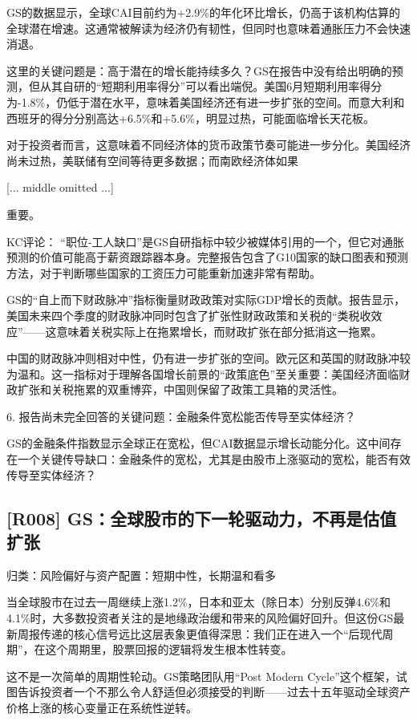 \documentclass[11pt]{ctexart}
\begin{document}
GS的数据显示，全球CAI目前约为+2.9\%的年化环比增长，仍高于该机构估算的全球潜在增速。这通常被解读为经济仍有韧性，但同时也意味着通胀压力不会快速消退。

这里的关键问题是：高于潜在的增长能持续多久？GS在报告中没有给出明确的预测，但从其自研的“短期利用率得分”可以看出端倪。美国6月短期利用率得分为-1.8\%，仍低于潜在水平，意味着美国经济还有进一步扩张的空间。而意大利和西班牙的得分分别高达+6.5\%和+5.6\%，明显过热，可能面临增长天花板。

对于投资者而言，这意味着不同经济体的货币政策节奏可能进一步分化。美国经济尚未过热，美联储有空间等待更多数据；而南欧经济体如果

[... middle omitted ...]

重要。

KC评论： “职位-工人缺口”是GS自研指标中较少被媒体引用的一个，但它对通胀预测的价值可能高于薪资跟踪器本身。完整报告包含了G10国家的缺口图表和预测方法，对于判断哪些国家的工资压力可能重新加速非常有帮助。

GS的“自上而下财政脉冲”指标衡量财政政策对实际GDP增长的贡献。报告显示，美国未来四个季度的财政脉冲同时包含了扩张性财政政策和关税的“类税收效应”——这意味着关税实际上在拖累增长，而财政扩张在部分抵消这一拖累。

中国的财政脉冲则相对中性，仍有进一步扩张的空间。欧元区和英国的财政脉冲较为温和。这一指标对于理解各国增长前景的“政策底色”至关重要：美国经济面临财政扩张和关税拖累的双重博弈，中国则保留了政策工具箱的灵活性。

6. 报告尚未完全回答的关键问题：金融条件宽松能否传导至实体经济？

GS的金融条件指数显示全球正在宽松，但CAI数据显示增长动能分化。这中间存在一个关键传导缺口：金融条件的宽松，尤其是由股市上涨驱动的宽松，能否有效传导至实体经济？

\subsection{[R008] GS：全球股市的下一轮驱动力，不再是估值扩张}
{\small\color{refgray}归类：风险偏好与资产配置：短期中性，长期温和看多}

当全球股市在过去一周继续上涨1.2\%，日本和亚太（除日本）分别反弹4.6\%和4.1\%时，大多数投资者关注的是地缘政治缓和带来的风险偏好回升。但这份GS最新周报传递的核心信号远比这层表象更值得深思：我们正在进入一个“后现代周期”，在这个周期里，股票回报的逻辑将发生根本性转变。

这不是一次简单的周期性轮动。GS策略团队用“Post Modern Cycle”这个框架，试图告诉投资者一个不那么令人舒适但必须接受的判断——过去十五年驱动全球资产价格上涨的核心变量正在系统性逆转。
\end{document}
